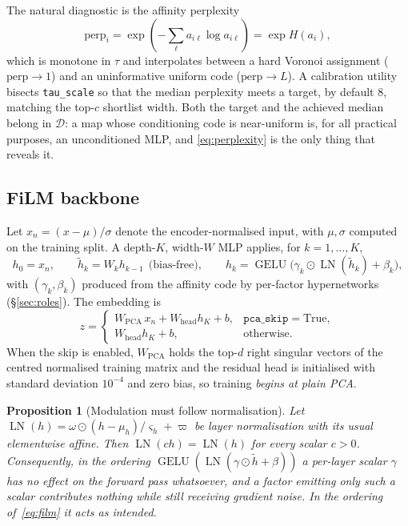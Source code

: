 \documentclass[12pt]{iopart}
\theoremstyle{definition}
\theoremstyle{plain}
\newtheorem{proposition}{Proposition}
\theoremstyle{remark}
\DeclareMathOperator{\LN}{LN}
\DeclareMathOperator{\GELU}{GELU}
\newcommand{\code}[1]{\texttt{#1}}
\begin{document}
The natural diagnostic is the affinity perplexity
\begin{equation}
\label{eq:perplexity}
\mathrm{perp}_i = \exp\!\left(-\sum_\ell a_{i\ell}\log a_{i\ell}\right)
= \exp H(a_i),
\end{equation}
which is monotone in $\tau$ and interpolates between a hard Voronoi assignment
($\mathrm{perp}\to 1$) and an uninformative uniform code
($\mathrm{perp}\to L$). A calibration utility bisects \code{tau\_scale} so that
the median perplexity meets a target, by default $8$, matching the top-$c$
shortlist width. Both the target and the achieved median belong in
$\mathcal{D}$: a map whose conditioning code is near-uniform is, for all
practical purposes, an unconditioned MLP, and \eqref{eq:perplexity} is the only
thing that reveals it.

\subsection{FiLM backbone}
\label{sec:film}

Let $x_n=(x-\mu)/\sigma$ denote the encoder-normalised input, with $\mu,\sigma$
computed on the training split. A depth-$K$, width-$W$ MLP applies, for
$k=1,\ldots,K$,
\begin{equation}
\label{eq:film}
h_0 = x_n,
\qquad
\tilde h_k = W_k h_{k-1}\ \ \text{(bias-free)},
\qquad
h_k = \GELU\!\bigl(\gamma_k\odot\LN(\tilde h_k)+\beta_k\bigr),
\end{equation}
with $(\gamma_k,\beta_k)$ produced from the affinity code by per-factor
hypernetworks (\S\ref{sec:roles}). The embedding is
\begin{equation}
\label{eq:z}
z =
\begin{cases}
W_{\mathrm{PCA}}\,x_n + W_{\mathrm{head}}h_K + b, & \code{pca\_skip}=\text{True},\\[3pt]
W_{\mathrm{head}}h_K + b, & \text{otherwise.}
\end{cases}
\end{equation}
When the skip is enabled, $W_{\mathrm{PCA}}$ holds the top-$d$ right singular
vectors of the centred normalised training matrix and the residual head is
initialised with standard deviation $10^{-4}$ and zero bias, so training \emph{begins at
plain PCA}.

\begin{proposition}[Modulation must follow normalisation]
\label{prop:filmorder}
Let $\LN(h)=\omega\odot(h-\mu_h)/\varsigma_h+\varpi$ be layer normalisation with
its usual elementwise affine. Then $\LN(ch)=\LN(h)$ for every scalar $c>0$.
Consequently, in the ordering $\GELU(\LN(\gamma\odot\tilde h+\beta))$ a
\emph{per-layer scalar} $\gamma$ has no effect on the forward pass whatsoever,
and a factor emitting only such a scalar contributes nothing while still
receiving gradient noise. In the ordering of~\eqref{eq:film} it acts as
intended.
\end{proposition}
\end{document}
